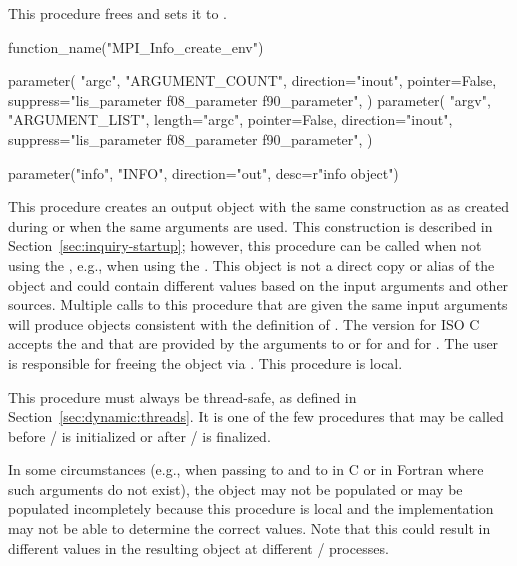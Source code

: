 This procedure frees  and sets it to .

\begin{mpi-binding}
    function_name("MPI_Info_create_env")

    parameter(
        "argc",
        "ARGUMENT_COUNT",
        direction="inout",
        pointer=False,
        suppress="lis_parameter f08_parameter f90_parameter",
    )
    parameter(
        "argv",
        "ARGUMENT_LIST",
        length="argc",
        pointer=False,
        direction="inout",
        suppress="lis_parameter f08_parameter f90_parameter",
    )

    parameter("info", "INFO", direction="out", desc=r"info object")
\end{mpi-binding}

This procedure creates an output object  with the same construction as
 as created during  or  when the
same arguments are used.
This construction is described in Section~\ref{sec:inquiry-startup};
however, this procedure can be called when not using the \wpm{}, e.g., when using the \spm{}.
This object is not a direct
copy or alias of the  object and could contain different values based on the
input arguments and other sources.  Multiple calls to this procedure that are given the same input
arguments will produce  objects consistent with the definition of
.  The version for ISO C accepts the  and  that are
provided by the arguments to  or  for  and  for
.  The user is responsible for freeing the  object via
.  This procedure is local.

This procedure must always be thread-safe, as defined in Section~\ref{sec:dynamic:threads}.  It is
one of the few procedures that may be called before \MPI/ is initialized or after \MPI/ is finalized.

\begin{users}

    In some circumstances (e.g., when passing  to  and  to
     in C or in Fortran where such arguments do not exist), the  object
    may not be populated or may be populated incompletely because this procedure is local and the
    implementation may not be able to determine the correct values. Note that this could result in
    different values in the resulting  object at different \MPI/ processes.

\end{users}
